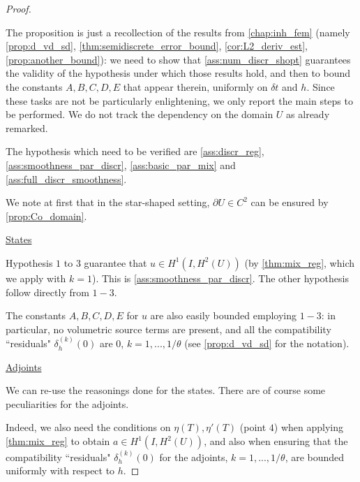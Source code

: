 \documentclass[english,a4paper,9pt,oneside]{scrbook}	%
\theoremstyle{break}
\newenvironment{mproof}[1][\proofname]{%
  \begin{proof}[#1]$ $\par\nobreak\ignorespaces
}{%
  \end{proof}
}
\renewcommand*{\proofname}{Proof}
\theoremstyle{remark}
\newcommand{\te}{\theta}
\begin{document}
\begin{mproof}

The proposition is just a recollection of the results from \cref{chap:inh_fem} (namely \cref{prop:d_vd_sd}, \cref{thm:semidiscrete_error_bound}, \cref{cor:L2_deriv_est}, \cref{prop:another_bound}): we need to show that \cref{ass:num_discr_shopt} guarantees the validity of the hypothesis under which those results hold, and then to bound the constants $A,B,C,D,E$ that appear therein, uniformly on $\delta t$ and $h$. Since these tasks are not be particularly enlightening, we only report the main steps to be performed. We do not track the dependency on the domain $U$ as already remarked.




The hypothesis which need to be verified are \cref{ass:discr_reg}, \cref{ass:smoothness_par_discr}, \cref{ass:basic_par_mix} and \cref{ass:full_discr_smoothness}.

We note at first that in the star-shaped setting, $\partial U \in C^2$ can be ensured by \cref{prop:Co_domain}.

\underline{States}

Hypothesis $1$ to $3$ guarantee that $u \in H^1(I,H^2(U))$ (by \cref{thm:mix_reg}, which we apply with $k=1$). This is \cref{ass:smoothness_par_discr}. The other hypothesis follow directly from $1-3$.

The constants $A,B,C,D,E$ for $u$ are also easily bounded employing $1-3$: in particular, no volumetric source terms are present, and all the compatibility ``residuals" $\delta_h^{(k)}(0)$ are $0$, $k=1,...,1/\te$ (see \cref{prop:d_vd_sd} for the notation).

\underline{Adjoints}

We can re-use the reasonings done for the states. There are of course some peculiarities for the adjoints.

Indeed, we also need the conditions on $\eta(T), \eta'(T)$ (point $4$) when applying \cref{thm:mix_reg} to obtain $a \in H^1(I,H^2(U))$, and also when ensuring that the compatibility ``residuals" $\delta_h^{(k)}(0)$ for the adjoints, $k=1,...,1/\te$, are bounded uniformly with respect to $h$.


\end{mproof}
\end{document}
